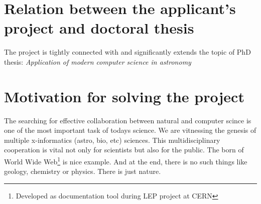 \documentclass[a4paper,10pt,oneside,onecolumn]{article}
\begin{document}
\section{Relation between the applicant's project and doctoral thesis}
The project is tightly connected with and significantly extends the
topic of PhD thesis: \textit{Application of modern computer science in
  astronomy}


\section{Motivation for solving the project}
The searching for effective collaboration between natural and computer
scince is one of the most important task of todays science. We are
vitnessing the genesis of multiple x-informatics (astro, bio, etc)
sciences. This multidisciplinary cooperation is vital not only for
scientists but also for the public. The born of World Wide
Web\footnote{Developed as documentation tool during LEP project at
  CERN} is nice example. And at the end, there is no such things like
geology, chemistry or physics. There is just nature.

\end{document}
